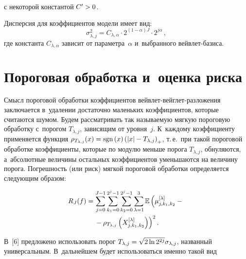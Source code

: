 \begin{multicols}{2}
\vspace*{-3pt}

\noindent
с некоторой константой $C'\hm>0$.

Дисперсия для коэффициентов модели имеет вид:
\begin{equation}
\label{Var_Model}
\sigma_{\lambda,j}^2=C_{\lambda,\alpha} \cdot 2^{(1-\alpha)J}\cdot 2^{j\alpha}\,,
\end{equation}
где константа $C_{\lambda,\alpha}$ зависит от параметра~$\alpha$
и~выбранного вейв\-лет-ба\-зиса.

\vspace*{-6pt}

\section{Пороговая обработка и~оценка риска}

\vspace*{-1pt}

Смысл пороговой обработки коэффициентов вейв\-лет-вейг\-лет-раз\-ло\-же\-ния
заключается в~удалении достаточно маленьких коэффициентов, которые считаются шумом.
Будем рассматривать так называемую мягкую пороговую обработку с~порогом
$T_{\lambda,j}$, зависящим от уровня~$j$. К~каждому
коэффи\-ци\-енту применяется функция
$\rho_{T_{\lambda,j}}(x)\hm=\mathrm{sgn}\left(x\right)\left(\abs{x}\hm -
T_{\lambda,j}\right)_{+}$, т.\,е.\ при такой пороговой обработ\-ке
коэффициенты, которые по модулю меньше порога $T_{\lambda,j}$,
обнуляются, а~абсолютные величины остальных коэффициентов
уменьшаются на величину порога. Погрешность (или риск) мягкой
пороговой обработки определяется следующим образом:

\vspace*{-2pt}

\noindent
\begin{multline}
\label{Risk_def}
R_J(f) = \sum\limits_{j = 0}^{J - 1}\sum_{k_1=0}^{2^j-1}\sum\limits_{k_2=0}^{2^j-1}
\sum\limits_{\lambda=1}^3 \mathbb{E}\left(\mu_{j,k_1,k_2}^{[\lambda]} -{}\right.\\
\left.{}-
\rho_{T_{\lambda,j}}\left(X_{j,k_1,k_2}^{[\lambda]}\right)\right)^2.
\end{multline}

В~[6] предложено использовать порог $T_{\lambda,j} \hm= \sqrt{2\ln 2^{2j}}
\sigma_{\lambda,j}$, названный универсальным.
В~дальнейшем будет использоваться именно такой вид\linebreak\vspace*{-12pt}


\end{multicols}
